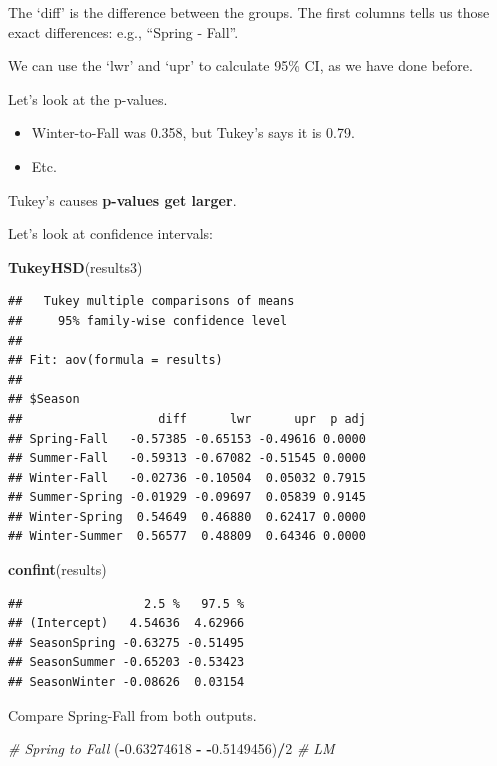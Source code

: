 \documentclass[
]{article}
\newenvironment{Shaded}{\begin{snugshade}}{\end{snugshade}}
\newcommand{\CommentTok}[1]{\textcolor[rgb]{0.56,0.35,0.01}{\textit{#1}}}
\newcommand{\DecValTok}[1]{\textcolor[rgb]{0.00,0.00,0.81}{#1}}
\newcommand{\FloatTok}[1]{\textcolor[rgb]{0.00,0.00,0.81}{#1}}
\newcommand{\FunctionTok}[1]{\textcolor[rgb]{0.13,0.29,0.53}{\textbf{#1}}}
\newcommand{\NormalTok}[1]{#1}
\newcommand{\SpecialCharTok}[1]{\textcolor[rgb]{0.81,0.36,0.00}{\textbf{#1}}}
\providecommand{\tightlist}{%
  \setlength{\itemsep}{0pt}\setlength{\parskip}{0pt}}
\begin{document}
The `diff' is the difference between the groups. The first columns tells
us those exact differences: e.g., ``Spring - Fall''.

We can use the `lwr' and `upr' to calculate 95\% CI, as we have done
before.

Let's look at the p-values.

\begin{itemize}
\tightlist
\item
  Winter-to-Fall was 0.358, but Tukey's says it is 0.79.
\item
  Etc.
\end{itemize}

Tukey's causes \textbf{p-values get larger}.

Let's look at confidence intervals:

\begin{Shaded}
\begin{Highlighting}[]
\FunctionTok{TukeyHSD}\NormalTok{(results3)}
\end{Highlighting}
\end{Shaded}

\begin{verbatim}
##   Tukey multiple comparisons of means
##     95% family-wise confidence level
## 
## Fit: aov(formula = results)
## 
## $Season
##                   diff      lwr      upr  p adj
## Spring-Fall   -0.57385 -0.65153 -0.49616 0.0000
## Summer-Fall   -0.59313 -0.67082 -0.51545 0.0000
## Winter-Fall   -0.02736 -0.10504  0.05032 0.7915
## Summer-Spring -0.01929 -0.09697  0.05839 0.9145
## Winter-Spring  0.54649  0.46880  0.62417 0.0000
## Winter-Summer  0.56577  0.48809  0.64346 0.0000
\end{verbatim}

\begin{Shaded}
\begin{Highlighting}[]
\FunctionTok{confint}\NormalTok{(results)}
\end{Highlighting}
\end{Shaded}

\begin{verbatim}
##                 2.5 %   97.5 %
## (Intercept)   4.54636  4.62966
## SeasonSpring -0.63275 -0.51495
## SeasonSummer -0.65203 -0.53423
## SeasonWinter -0.08626  0.03154
\end{verbatim}

Compare Spring-Fall from both outputs.

\begin{Shaded}
\begin{Highlighting}[]
\CommentTok{\# Spring to Fall}
\NormalTok{(}\SpecialCharTok{{-}}\FloatTok{0.63274618} \SpecialCharTok{{-}} \SpecialCharTok{{-}}\FloatTok{0.5149456}\NormalTok{)}\SpecialCharTok{/}\DecValTok{2} \CommentTok{\# LM}
\end{Highlighting}
\end{Shaded}
\end{document}
